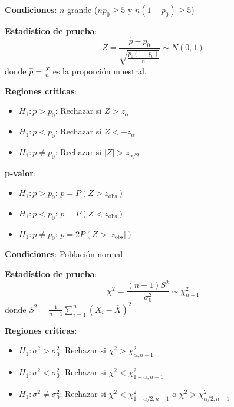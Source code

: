 \documentclass[10pt,a4paper]{article}
\begin{document}

\begin{tcolorbox}[title=Contraste para una Proporción]
    \textbf{Condiciones}: $n$ grande ($np_0 \geq 5$ y $n(1-p_0) \geq 5$)
    
    \textbf{Estadístico de prueba}:
    \[
        Z = \frac{\hat{p} - p_0}{\sqrt{\frac{p_0(1-p_0)}{n}}} \sim N(0,1)
    \]
    donde $\hat{p} = \frac{X}{n}$ es la proporción muestral.
    
    \textbf{Regiones críticas}:
    \begin{itemize}
        \item $H_1: p > p_0$: Rechazar si $Z > z_\alpha$
        \item $H_1: p < p_0$: Rechazar si $Z < -z_\alpha$
        \item $H_1: p \neq p_0$: Rechazar si $|Z| > z_{\alpha/2}$
    \end{itemize}
    
    \textbf{p-valor}:
    \begin{itemize}
        \item $H_1: p > p_0$: $p = P(Z > z_{\text{obs}})$
        \item $H_1: p < p_0$: $p = P(Z < z_{\text{obs}})$
        \item $H_1: p \neq p_0$: $p = 2P(Z > |z_{\text{obs}}|)$
    \end{itemize}
\end{tcolorbox}


\begin{tcolorbox}[title=Contraste para la Varianza]
    \textbf{Condiciones}: Población normal
    
    \textbf{Estadístico de prueba}:
    \[
        \chi^2 = \frac{(n-1)S^2}{\sigma_0^2} \sim \chi^2_{n-1}
    \]
    donde $S^2 = \frac{1}{n-1}\sum_{i=1}^n (X_i - \bar{X})^2$
    
    \textbf{Regiones críticas}:
    \begin{itemize}
        \item $H_1: \sigma^2 > \sigma_0^2$: Rechazar si $\chi^2 > \chi^2_{\alpha, n-1}$
        \item $H_1: \sigma^2 < \sigma_0^2$: Rechazar si $\chi^2 < \chi^2_{1-\alpha, n-1}$
        \item $H_1: \sigma^2 \neq \sigma_0^2$: Rechazar si $\chi^2 < \chi^2_{1-\alpha/2, n-1}$ o $\chi^2 > \chi^2_{\alpha/2, n-1}$
    \end{itemize}
\end{tcolorbox}
\end{document}
